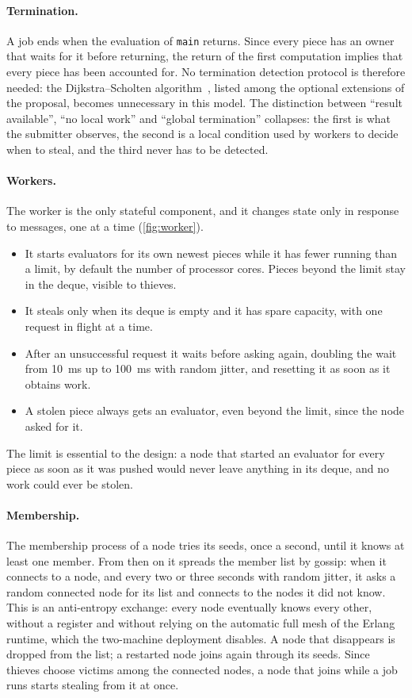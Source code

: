 \documentclass{scrartcl}
\begin{document}
\paragraph{Termination.}
A job ends when the evaluation of \texttt{main} returns.
%
Since every piece has an owner that waits for it before returning, the return of the first computation implies that every piece has been accounted for.
%
No termination detection protocol is therefore needed: the Dijkstra--Scholten algorithm~\cite{dijkstra1980termination}, listed among the optional extensions of the proposal, becomes unnecessary in this model.
%
The distinction between ``result available'', ``no local work'' and ``global termination'' collapses: the first is what the submitter observes, the second is a local condition used by workers to decide when to steal, and the third never has to be detected.

\paragraph{Workers.}
The worker is the only stateful component, and it changes state only in response to messages, one at a time (\cref{fig:worker}).
%
\begin{itemize}
  \item It starts evaluators for its own newest pieces while it has fewer running than a limit, by default the number of processor cores. Pieces beyond the limit stay in the deque, visible to thieves.
  \item It steals only when its deque is empty and it has spare capacity, with one request in flight at a time.
  \item After an unsuccessful request it waits before asking again, doubling the wait from 10~ms up to 100~ms with random jitter, and resetting it as soon as it obtains work.
  \item A stolen piece always gets an evaluator, even beyond the limit, since the node asked for it.
\end{itemize}

The limit is essential to the design: a node that started an evaluator for every piece as soon as it was pushed would never leave anything in its deque, and no work could ever be stolen.

\paragraph{Membership.}
The membership process of a node tries its seeds, once a second, until it knows at least one member.
%
From then on it spreads the member list by gossip: when it connects to a node, and every two or three seconds with random jitter, it asks a random connected node for its list and connects to the nodes it did not know.
%
This is an anti-entropy exchange: every node eventually knows every other, without a register and without relying on the automatic full mesh of the Erlang runtime, which the two-machine deployment disables.
%
A node that disappears is dropped from the list; a restarted node joins again through its seeds.
%
Since thieves choose victims among the connected nodes, a node that joins while a job runs starts stealing from it at once.
\end{document}
